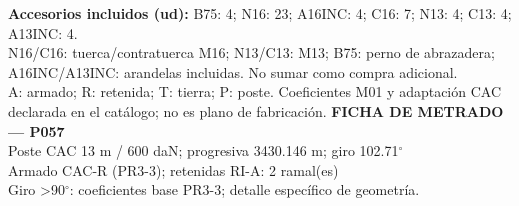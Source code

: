 \begingroup\scriptsize
\textbf{Accesorios incluidos (ud):} B75: 4; N16: 23; A16INC: 4; C16: 7; N13: 4; C13: 4; A13INC: 4.\\
N16/C16: tuerca/contratuerca M16; N13/C13: M13; B75: perno de abrazadera; A16INC/A13INC: arandelas incluidas. No sumar como compra adicional.\\
A: armado; R: retenida; T: tierra; P: poste. Coeficientes M01 y adaptación CAC declarada en el catálogo; no es plano de fabricación.
\endgroup\endgroup
\clearpage{}
\begingroup\small\setlength{\parskip}{3pt}\renewcommand{\arraystretch}{1.05}
\textbf{\large FICHA DE METRADO — P057}\\[4pt]
Poste CAC 13 m / 600 daN; progresiva 3430.146 m; giro 102.71\ensuremath{^\circ}\\
Armado CAC-R (PR3-3); retenidas RI-A: 2 ramal(es)\\
Giro >90\ensuremath{^\circ}: coeficientes base PR3-3; detalle específico de geometría.\\
\begingroup\scriptsize
